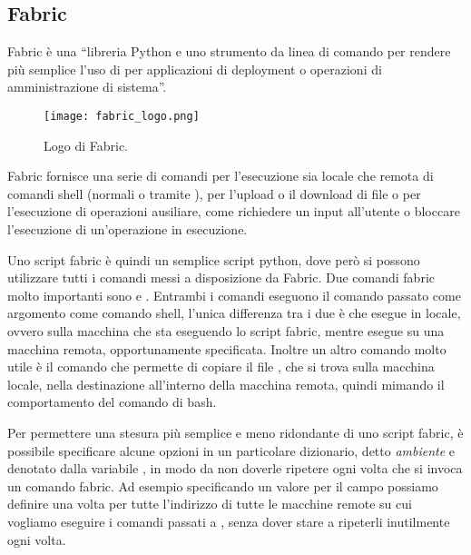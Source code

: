         \subsection{Fabric} \label{subsec:p;sl;fabric}
        
            Fabric è una ``libreria Python e uno strumento da linea di comando per rendere più semplice l'uso di  per applicazioni di deployment o operazioni di amministrazione di sistema''. \cite{fabric:documentation}
            
        	\begin{figure}[h!]
        		\begin{center}
        			\texttt{[image: fabric\_logo.png]}
        		\end{center}
        		\caption[Logo di Fabric]{Logo di Fabric.}
        		\label{fig:fabric_logo}
        	\end{figure}
            
            Fabric fornisce una serie di comandi per l'esecuzione sia locale che remota di comandi shell (normali o tramite ), per l'upload o il download di file o per l'esecuzione di operazioni ausiliare, come richiedere un input all'utente o bloccare l'esecuzione di un'operazione in esecuzione.
            
            Uno script fabric è quindi un semplice script python, dove però si possono utilizzare tutti i comandi messi a disposizione da Fabric. Due comandi fabric molto importanti sono  e . Entrambi i comandi eseguono il comando  passato come argomento come comando shell, l'unica differenza tra i due è che  esegue  in locale, ovvero sulla macchina che sta eseguendo lo script fabric, mentre  esegue  su una macchina remota, opportunamente specificata. Inoltre un altro comando molto utile è il comando  che permette di copiare il file , che si trova sulla macchina locale, nella destinazione  all'interno della macchina remota, quindi mimando il comportamento del comando  di bash.
            
            Per permettere una stesura più semplice e meno ridondante di uno script fabric, è possibile specificare alcune opzioni in un particolare dizionario, detto \textit{ambiente} e denotato dalla variabile , in modo da non doverle ripetere ogni volta che si invoca un comando fabric. Ad esempio specificando un valore per il campo  possiamo definire una volta per tutte l'indirizzo di tutte le macchine remote su cui vogliamo eseguire i comandi passati a , senza dover stare a ripeterli inutilmente ogni volta.
            
